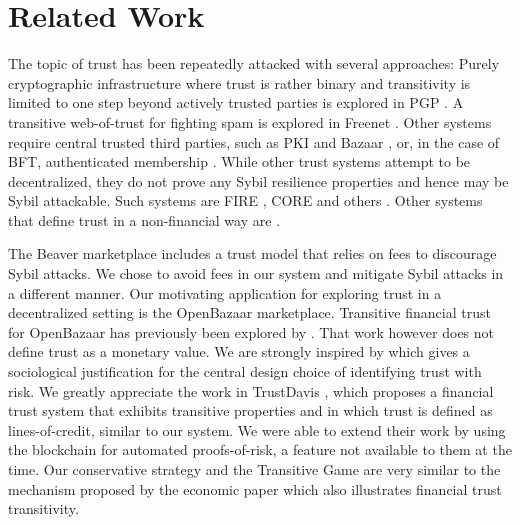 \section{Related Work}
   The topic of trust has been repeatedly attacked with several approaches: Purely cryptographic infrastructure where trust
   is rather binary and transitivity is limited to one step beyond actively trusted parties is explored in PGP \cite{pgp}. A
   transitive web-of-trust for fighting spam is explored in Freenet \cite{freenet}. Other systems require central trusted
   third parties, such as PKI \cite{pki} and Bazaar \cite{bazaar}, or, in the case of BFT, authenticated membership
   \cite{byzantine}. While other trust systems attempt to be decentralized, they do not prove any Sybil resilience properties
   and hence may be Sybil attackable. Such systems are FIRE \cite{fire}, CORE \cite{core} and others \cite{openrep,ghkkw,rk}.
   Other systems that define trust in a non-financial way are \cite{mui,beta,pace,vpc,sdt,wot,pathfinder}.

   The Beaver marketplace \cite{beaver} includes a trust model that relies on
   fees to discourage Sybil attacks. We chose to avoid fees in our system and mitigate Sybil attacks in a different manner.
   Our motivating application for exploring trust in a decentralized setting is the OpenBazaar marketplace. Transitive
   financial trust for OpenBazaar has previously been explored by \cite{dionyziz}. That work however does not define trust
   as a monetary value. We are strongly inspired by \cite{kmrs}
   which gives a sociological justification for the central design choice of identifying trust with
   risk. We greatly appreciate the work in TrustDavis \cite{davis}, which proposes a financial trust system that exhibits
   transitive properties and in which trust is defined as lines-of-credit, similar to our system. We were able to extend
   their work by using the blockchain for automated proofs-of-risk, a feature not available to them at the time. Our
   conservative strategy and the Transitive Game are very similar to the mechanism proposed by the economic paper
   \cite{iou} which also illustrates financial trust transitivity. 

